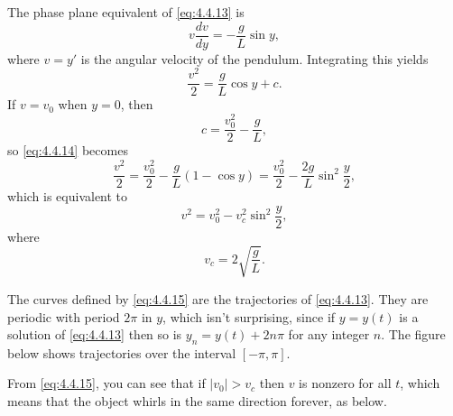 \documentclass{ximera}
\begin{document}
\begin{example}
 
 
The phase plane equivalent of \eqref{eq:4.4.13} is
$$
v\frac{dv}{dy}=-\frac{g}{L}\sin y,
$$
where $v=y'$ is the angular velocity of the pendulum. Integrating this
yields
\begin{equation} \label{eq:4.4.14}
\frac{v^2}{2}=\frac{g}{L}\cos y+c.
\end{equation}
If $v=v_0$ when $y=0$, then
$$
c=\frac{v_0^2}{2}-\frac{g}{L},
$$
so \eqref{eq:4.4.14} becomes
$$
\frac{v^2}{2}=\frac{v_0^2}{2}-\frac{g}{L}(1-\cos y)
=\frac{v_0^2}{2}-\frac{2g}{L}\sin^2\frac{y}{2},
$$
which is equivalent to
\begin{equation} \label{eq:4.4.15}
v^2=v_0^2-v_c^2\sin^2\frac{y}{2},
\end{equation}
 where
$$
v_c=2\sqrt{\frac{g}{L}}.
$$
 
The curves defined by \eqref{eq:4.4.15} are the trajectories of
\eqref{eq:4.4.13}. They are periodic with period $2\pi$ in $y$, which isn't
 surprising, since if $y=y(t)$ is a solution of \eqref{eq:4.4.13} then
so is $y_n=y(t)+2n\pi$ for any integer $n$. The figure below
shows trajectories over the interval $[-\pi,\pi]$.

\begin{center}
\end{center}
 
 
 
From \eqref{eq:4.4.15},
you can see that if $|v_0|>v_c$ then $v$ is nonzero for all $t$, which
means that the object whirls in the same direction forever, as below.

\begin{center}
\end{center}
 

\end{example}
\end{document}
